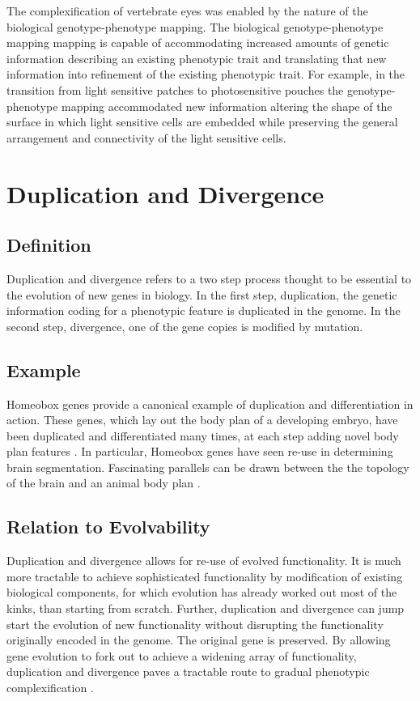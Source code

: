 The complexification of vertebrate eyes was enabled by the nature of the biological genotype-phenotype mapping.
The biological genotype-phenotype mapping mapping is capable of accommodating increased amounts of genetic information describing an existing phenotypic trait and translating that new information into refinement of the existing phenotypic trait.
For example, in the transition from light sensitive patches to photosensitive pouches the genotype-phenotype mapping accommodated new information altering the shape of the surface in which light sensitive cells are embedded while preserving the general arrangement and connectivity of the light sensitive cells.

\section{Duplication and Divergence} \label{sec:duplication_and_divergence}

\subsection{Definition}
Duplication and divergence refers to a two step process thought to be essential to the evolution of new genes in biology.
In the first step, duplication, the genetic information coding for a phenotypic feature is duplicated in the genome.
In the second step, divergence, one of the gene copies is modified by mutation.

\subsection{Example}
Homeobox genes provide a canonical example of duplication and differentiation in action.
These genes, which lay out the body plan of a developing embryo, have been duplicated and differentiated many times, at each step adding novel body plan features \cite[p 203]{Downing2015IntelligenceSystems}.
In particular, Homeobox genes have seen re-use in determining brain segmentation.
Fascinating parallels can be drawn between the the topology of the brain and an animal body plan \cite[p 201]{Downing2015IntelligenceSystems}.

\subsection{Relation to Evolvability}

Duplication and divergence allows for re-use of evolved functionality. It is much more tractable to achieve sophisticated functionality by modification of existing biological components, for which evolution has already worked out most of the kinks, than starting from scratch. 
Further, duplication and divergence can jump start the evolution of new functionality without disrupting the functionality originally encoded in the genome.
The original gene is preserved.
By allowing gene evolution to fork out to achieve a widening array of functionality, duplication and divergence paves a tractable route to gradual phenotypic complexification \cite[p 202]{Downing2015IntelligenceSystems}.


